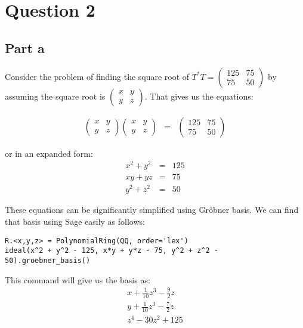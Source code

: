 \section*{Question 2}
\subsection*{Part a}
Consider the problem of finding the square root of $ T^* T = \left(\begin{array}{cc} 125 & 75 \\ 75 & 50 \end{array}\right) $ by assuming the square root is $ \left(\begin{array}{cc} x & y \\ y & z \end{array}\right)$. That gives us the equations:

\begin{eqnarray*}
  \left(\begin{array}{cc} x & y \\ y & z \end{array}\right)\left(\begin{array}{cc} x & y \\ y & z \end{array}\right) &=& \left(\begin{array}{cc} 125 & 75 \\ 75 & 50 \end{array}\right)
\end{eqnarray*}

or in an expanded form:
\begin{eqnarray*}
  x^2 + y^2 &=& 125 \\
    xy + yz &=& 75  \\
  y^2 + z^2 &=& 50
\end{eqnarray*}

These equations can be significantly simplified using Gröbner basis. We can find that basis using Sage easily as follows:

\begin{verbatim}
R.<x,y,z> = PolynomialRing(QQ, order='lex')
ideal(x^2 + y^2 - 125, x*y + y*z - 75, y^2 + z^2 - 50).groebner_basis()
\end{verbatim}

This command will give us the basis as:
\begin{eqnarray*}
  x + \frac{1}{10}z^3 - \frac{9}{2}z \\
  y + \frac{1}{10}z^3 - \frac{7}{2}z \\
  z^4 - 30z^2 + 125 
\end{eqnarray*}

